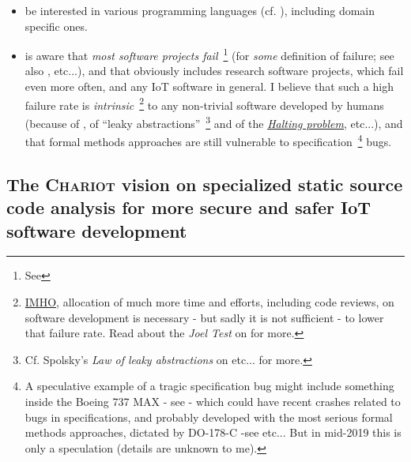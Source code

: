 \begin{itemize}
  \item be interested in various programming languages
    (cf. \cite{Abelson1996:SICP,Scott:2007:PLP,Queinnec:1996:LSP}),
    including domain specific ones.

    \item is aware that \emph{most software projects
      fail}~\footnote{See
      }
      (for \emph{some} definition of failure; see also \cite{Brooks:1995:MM, Khan:2016-GSEPIM,
      Attarzadeh:2008:proj-man}, etc...), and that obviously includes
      research software projects, which fail even more often, and any
      IoT software in general. I believe that such a high failure rate
      is
      \emph{intrinsic}~\footnote{\href{https://en.wiktionary.org/wiki/IMHO}{IMHO},
        allocation of much more time and efforts, including code
        reviews, on software development is necessary - but sadly it is not
        sufficient - to lower that failure rate. Read about the \emph{Joel Test} on  for more.}  to any non-trivial
      software developed by humans (because of
      \cite{Braun:1956:magical-seven}, of ``leaky
      abstractions''~\footnote{Cf. Spolsky's \emph{Law of leaky
          abstractions} on
        etc... for more.}  and of the
      \href{https://en.wikipedia.org/wiki/Halting\_problem}{\emph{Halting
          problem}}, etc...), and that formal methods approaches are
      still vulnerable to specification~\footnote{A speculative
        example of a tragic specification bug might include something
        inside the Boeing 737 MAX - see
         - which
        could have recent crashes related to bugs in specifications,
        and probably developed with the most serious formal methods
        approaches, dictated by DO-178-C -see
         etc... But in
        mid-2019 this is only a speculation (details are unknown to
        me).} bugs.

\end{itemize}


\bigskip

\subsection{The \textsc{Chariot} vision on specialized static source code analysis for more secure and safer IoT software development}
\label{subsec:chariotvision}
